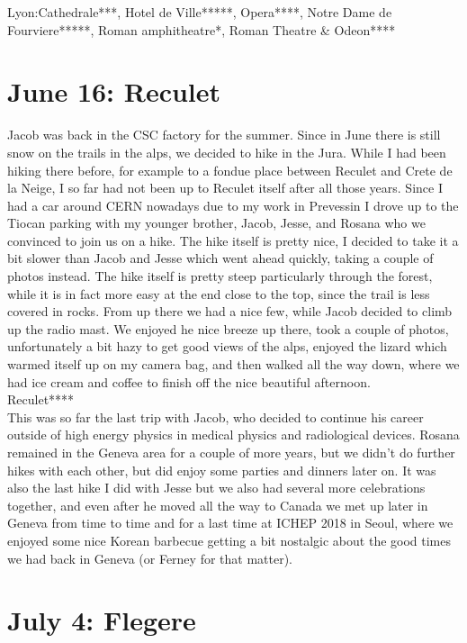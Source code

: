 Lyon:Cathedrale***, Hotel de Ville*****, Opera****, Notre Dame de Fourviere*****, Roman amphitheatre*, Roman Theatre \& Odeon****\\

\section{June 16: Reculet}
\label{Reculet2013}

Jacob was back in the CSC factory for the summer. Since in June there is still snow on the trails in the alps, we decided to hike in the Jura. While I had been hiking there before, for example to a fondue place between Reculet and Crete de la Neige, I so far had not been up to Reculet itself after all those years. Since I had a car around CERN nowadays due to my work in Prevessin I drove up to the Tiocan parking with my younger brother, Jacob, Jesse, and Rosana who we convinced to join us on a hike. The hike itself is pretty nice, I decided to take it a bit slower than Jacob and Jesse which went ahead quickly, taking a couple of photos instead. The hike itself is pretty steep particularly through the forest, while it is in fact more easy at the end close to the top, since the trail is less covered in rocks. From up there we had a nice few, while Jacob decided to climb up the radio mast. We enjoyed he nice breeze up there, took a couple of photos, unfortunately a bit hazy to get good views of the alps, enjoyed the lizard which warmed itself up on my camera bag, and then walked all the way down, where we had ice cream and coffee to finish off the nice beautiful afternoon.\\

Reculet****\\

This was so far the last trip with Jacob, who decided to continue his career outside of high energy physics in medical physics and radiological devices. Rosana remained in the Geneva area for a couple of more years, but we didn't do further hikes with each other, but did enjoy some parties and dinners later on. It was also the last hike I did with Jesse but we also had several more celebrations together, and even after he moved all the way to Canada we met up later in Geneva from time to time and for a last time at ICHEP 2018 in Seoul, where we enjoyed some nice Korean barbecue getting a bit nostalgic about the good times we had back in Geneva (or Ferney for that matter).

\section{July 4: Flegere}
\label{Flegere2013}

